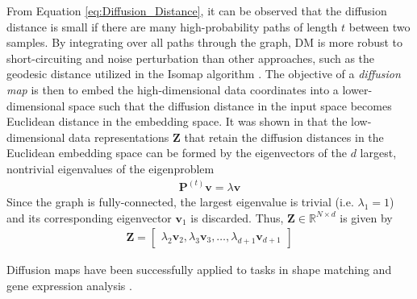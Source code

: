 From Equation \ref{eq:Diffusion_Distance}, it can be observed that the diffusion distance is small if there are many high-probability paths of length $t$ between two samples.  By integrating over all paths through the graph, DM is more robust to short-circuiting and noise perturbation than other approaches, such as the geodesic distance utilized in the  Isomap algorithm \citep{VanDerMaaten2009DRReview, Delaporte2008DiffusionMaps, Tenenbaum2000Isomap}.  The objective of a \textit{diffusion map} is then to embed the high-dimensional data coordinates into a lower-dimensional space such that the diffusion distance in the input space becomes Euclidean distance in the embedding space.  It was shown in \citep{Coifman2006DiffusionMaps,Delaporte2008DiffusionMaps} that the low-dimensional data representations $\bm{Z}$ that retain the diffusion distances in the Euclidean embedding space can be formed by the eigenvectors of the $d$ largest, nontrivial eigenvalues of the eigenproblem 
\begin{align}
	\bm{P}^{(t)}\bm{v} = \lambda \bm{v}
\end{align}
\noindent
Since the graph is fully-connected, the largest eigenvalue is trivial (i.e. $\lambda_{1} = 1$) and its corresponding eigenvector $\bm{v}_{1}$ is discarded.  Thus, $\bm{Z} \in \mathbb{R}^{N \times d}$ is given by 
\begin{align}
	\bm{Z} = \begin{bmatrix}
		\lambda_{2} \bm{v}_{2}, \lambda_{3} \bm{v}_{3}, \dots, \lambda_{d+1} \bm{v}_{d+1}
	\end{bmatrix}
\end{align}

Diffusion maps have been successfully applied to tasks in shape matching and gene expression analysis \citep{VanDerMaaten2009DRReview}.


